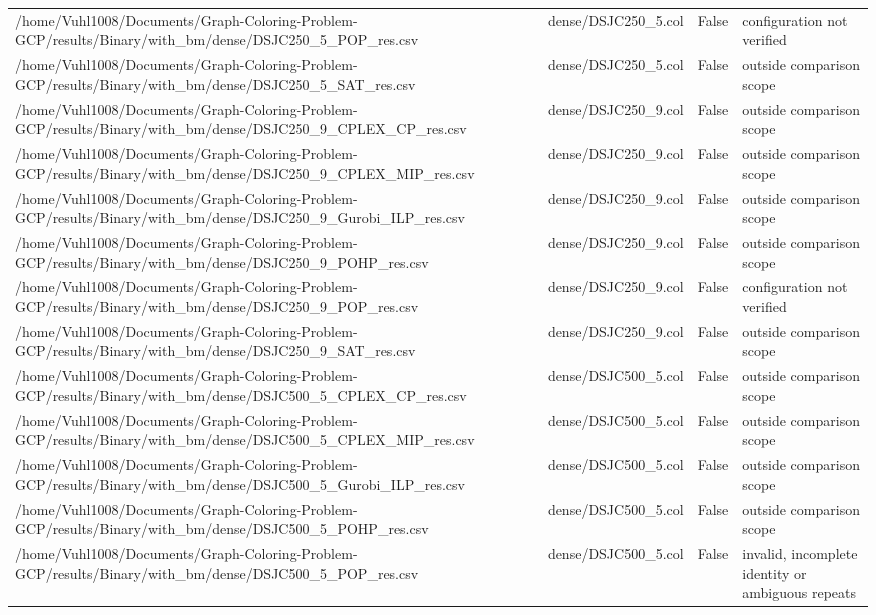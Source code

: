 \begin{table}[htbp]
\begin{tabular}{llll}
/home/Vuhl1008/Documents/Graph-Coloring-Problem-GCP/results/Binary/with\_bm/dense/DSJC250\_5\_POP\_res.csv & dense/DSJC250\_5.col & False & configuration not verified \\
/home/Vuhl1008/Documents/Graph-Coloring-Problem-GCP/results/Binary/with\_bm/dense/DSJC250\_5\_SAT\_res.csv & dense/DSJC250\_5.col & False & outside comparison scope \\
/home/Vuhl1008/Documents/Graph-Coloring-Problem-GCP/results/Binary/with\_bm/dense/DSJC250\_9\_CPLEX\_CP\_res.csv & dense/DSJC250\_9.col & False & outside comparison scope \\
/home/Vuhl1008/Documents/Graph-Coloring-Problem-GCP/results/Binary/with\_bm/dense/DSJC250\_9\_CPLEX\_MIP\_res.csv & dense/DSJC250\_9.col & False & outside comparison scope \\
/home/Vuhl1008/Documents/Graph-Coloring-Problem-GCP/results/Binary/with\_bm/dense/DSJC250\_9\_Gurobi\_ILP\_res.csv & dense/DSJC250\_9.col & False & outside comparison scope \\
/home/Vuhl1008/Documents/Graph-Coloring-Problem-GCP/results/Binary/with\_bm/dense/DSJC250\_9\_POHP\_res.csv & dense/DSJC250\_9.col & False & outside comparison scope \\
/home/Vuhl1008/Documents/Graph-Coloring-Problem-GCP/results/Binary/with\_bm/dense/DSJC250\_9\_POP\_res.csv & dense/DSJC250\_9.col & False & configuration not verified \\
/home/Vuhl1008/Documents/Graph-Coloring-Problem-GCP/results/Binary/with\_bm/dense/DSJC250\_9\_SAT\_res.csv & dense/DSJC250\_9.col & False & outside comparison scope \\
/home/Vuhl1008/Documents/Graph-Coloring-Problem-GCP/results/Binary/with\_bm/dense/DSJC500\_5\_CPLEX\_CP\_res.csv & dense/DSJC500\_5.col & False & outside comparison scope \\
/home/Vuhl1008/Documents/Graph-Coloring-Problem-GCP/results/Binary/with\_bm/dense/DSJC500\_5\_CPLEX\_MIP\_res.csv & dense/DSJC500\_5.col & False & outside comparison scope \\
/home/Vuhl1008/Documents/Graph-Coloring-Problem-GCP/results/Binary/with\_bm/dense/DSJC500\_5\_Gurobi\_ILP\_res.csv & dense/DSJC500\_5.col & False & outside comparison scope \\
/home/Vuhl1008/Documents/Graph-Coloring-Problem-GCP/results/Binary/with\_bm/dense/DSJC500\_5\_POHP\_res.csv & dense/DSJC500\_5.col & False & outside comparison scope \\
/home/Vuhl1008/Documents/Graph-Coloring-Problem-GCP/results/Binary/with\_bm/dense/DSJC500\_5\_POP\_res.csv & dense/DSJC500\_5.col & False & invalid, incomplete identity or ambiguous repeats \\

\end{tabular}
\end{table}
